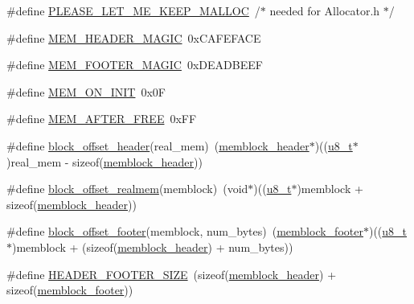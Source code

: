 \begin{DoxyCompactItemize}
\item 
\#define \hyperlink{_allocator_8cc_aa1f641399ffe977d4d86824c2d1da2fb}{P\-L\-E\-A\-S\-E\-\_\-\-L\-E\-T\-\_\-\-M\-E\-\_\-\-K\-E\-E\-P\-\_\-\-M\-A\-L\-L\-O\-C}~/$\ast$ needed for Allocator.\-h $\ast$/
\item 
\#define \hyperlink{_allocator_8cc_a2db6c9af5aa02be13a49f706da54385c}{M\-E\-M\-\_\-\-H\-E\-A\-D\-E\-R\-\_\-\-M\-A\-G\-I\-C}~0x\-C\-A\-F\-E\-F\-A\-C\-E
\item 
\#define \hyperlink{_allocator_8cc_adb9b241eeb9083c288e77112c7e7b0a5}{M\-E\-M\-\_\-\-F\-O\-O\-T\-E\-R\-\_\-\-M\-A\-G\-I\-C}~0x\-D\-E\-A\-D\-B\-E\-E\-F
\item 
\#define \hyperlink{_allocator_8cc_ada833569779d8c8a9b8415e8112c1fad}{M\-E\-M\-\_\-\-O\-N\-\_\-\-I\-N\-I\-T}~0x0\-F
\item 
\#define \hyperlink{_allocator_8cc_ab4cd30097b76edd986e9f0db035b6279}{M\-E\-M\-\_\-\-A\-F\-T\-E\-R\-\_\-\-F\-R\-E\-E}~0x\-F\-F
\item 
\#define \hyperlink{_allocator_8cc_a4535345fe0fa840b2b74ce4eaf6dd004}{block\-\_\-offset\-\_\-header}(real\-\_\-mem)~(\hyperlink{structmemblock__header}{memblock\-\_\-header}$\ast$)((\hyperlink{types_8h_ae081489b4906f65a3cb18e9fbe9f8d23}{u8\-\_\-t}$\ast$)real\-\_\-mem -\/ sizeof(\hyperlink{structmemblock__header}{memblock\-\_\-header}))
\item 
\#define \hyperlink{_allocator_8cc_ad4ec1862e1c0007f85c0d0eb6b75ff91}{block\-\_\-offset\-\_\-realmem}(memblock)~(void$\ast$)((\hyperlink{types_8h_ae081489b4906f65a3cb18e9fbe9f8d23}{u8\-\_\-t}$\ast$)memblock + sizeof(\hyperlink{structmemblock__header}{memblock\-\_\-header}))
\item 
\#define \hyperlink{_allocator_8cc_aff46be828cb143ee0ffde154ac547a46}{block\-\_\-offset\-\_\-footer}(memblock, num\-\_\-bytes)~(\hyperlink{structmemblock__footer}{memblock\-\_\-footer}$\ast$)((\hyperlink{types_8h_ae081489b4906f65a3cb18e9fbe9f8d23}{u8\-\_\-t}$\ast$)memblock + (sizeof(\hyperlink{structmemblock__header}{memblock\-\_\-header}) + num\-\_\-bytes))
\item 
\#define \hyperlink{_allocator_8cc_a23fcee323662954abeea9a2b0d3d7bdf}{H\-E\-A\-D\-E\-R\-\_\-\-F\-O\-O\-T\-E\-R\-\_\-\-S\-I\-Z\-E}~(sizeof(\hyperlink{structmemblock__header}{memblock\-\_\-header}) + sizeof(\hyperlink{structmemblock__footer}{memblock\-\_\-footer}))
\end{DoxyCompactItemize}
